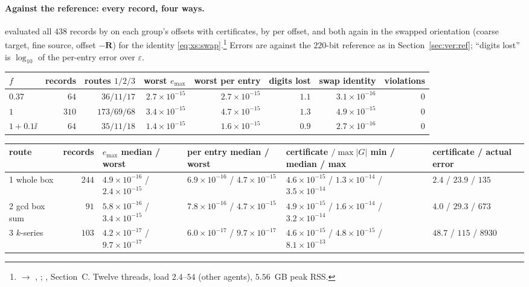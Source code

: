 \paragraph{Against the reference: every record, four ways.}  evaluated all
$438$ records by  on each group's offsets with certificates, by
 per offset, and both again in the swapped orientation (coarse target,
fine source, offset $-\mathbf{R}$) for the identity
\eqref{eq:xs:swap}.\footnote{ $\to$ ,
; , Section~C. Twelve threads, load
$2.4$--$54$ (other agents), $5.56$~GB peak RSS.} Errors are against the $220$-bit reference
as in Section~\ref{sec:ver:ref}; ``digits lost'' is $\log_{10}$ of the per-entry error over
$\varepsilon$.

\begin{center}\footnotesize
\begin{tabular}{@{}lrrrrrrr@{}}
\toprule
$f$ & records & routes $1/2/3$ & worst $e_{\max}$ & worst per entry & digits lost & swap identity & violations\\
\midrule
$0.37$ & $64$ & $36/11/17$ & $2.7\times10^{-15}$ & $2.7\times10^{-15}$ & $1.1$ & $3.1\times10^{-16}$ & $0$\\
$1$ & $310$ & $173/69/68$ & $3.4\times10^{-15}$ & $4.7\times10^{-15}$ & $1.3$ & $4.9\times10^{-15}$ & $0$\\
$1+0.1\ii$ & $64$ & $35/11/18$ & $1.4\times10^{-15}$ & $1.6\times10^{-15}$ & $0.9$ & $2.7\times10^{-16}$ & $0$\\
\bottomrule
\end{tabular}

\medskip
\begin{tabular}{@{}lrL{0.17\textwidth}L{0.17\textwidth}L{0.21\textwidth}L{0.13\textwidth}@{}}
\toprule
route & records & $e_{\max}$ median / worst & per entry median / worst & certificate $/\max|G|$ min / median / max & certificate / actual error\\
 whole box & $244$ & $4.9\times10^{-16}$ / $2.4\times10^{-15}$ & $6.9\times10^{-16}$ / $4.7\times10^{-15}$ & $4.6\times10^{-15}$ / $1.3\times10^{-14}$ / $3.5\times10^{-14}$ & $2.4$ / $23.9$ / $135$\\
2 gcd box sum & $91$ & $5.8\times10^{-16}$ / $3.4\times10^{-15}$ & $7.8\times10^{-16}$ / $4.7\times10^{-15}$ & $4.9\times10^{-15}$ / $1.6\times10^{-14}$ / $3.2\times10^{-14}$ & $4.0$ / $29.3$ / $673$\\
3 $k$-series & $103$ & $4.2\times10^{-17}$ / $9.7\times10^{-17}$ & $6.0\times10^{-17}$ / $9.7\times10^{-17}$ & $4.6\times10^{-15}$ / $4.8\times10^{-15}$ / $8.1\times10^{-13}$ & $48.7$ / $115$ / $8930$\\
\bottomrule
\end{tabular}
\end{center}

